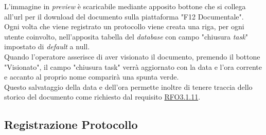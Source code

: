         L'immagine in \textit{preview} è scaricabile mediante apposito bottone che si collega all'url per il download del documento sulla piattaforma "F12 Documentale".
        \\
        Ogni volta che viene registrato un protocollo viene creata una riga, per ogni utente coinvolto, nell'apposita tabella del \textit{database} con campo "chiusura \textit{task}" impostato di \textit{default} a null.
        \\
        Quando l'operatore asserisce di aver visionato il documento, premendo il bottone "Visionato", il campo "chiusura task" verrà aggiornato con la data e l'ora corrente e accanto al proprio nome comparirà una spunta verde.
        \\
        Questo salvataggio della data e dell'ora permette inoltre di tenere traccia dello storico del documento come richiesto dal requisito \hyperref[RFO3.1.11]{RFO3.1.11}.
        
\subsection{Registrazione Protocollo}
